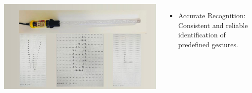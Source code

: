 \documentclass[25pt,a0paper, portrait]{tikzposter}
\begin{document}
\begin{columns}
{{\begin{tikzfigure}
					\includegraphics[height= 24 cm, width=\linewidth]{images/output}
						
				\end{tikzfigure}	
		
				\begin{itemize}
					
					\item Accurate Recognition: Consistent and reliable identification of predefined gestures.
					
			\end{itemize}
		}
	}		
		
	\end{columns}
	
\end{document}
